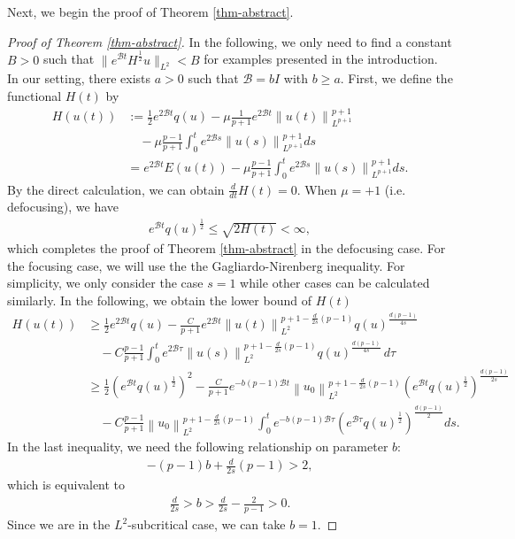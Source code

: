 \documentclass[10pt%
]{amsart}
\numberwithin{equation}{section}
\theoremstyle{definition}
\begin{document}
Next, we begin the  proof of Theorem \ref{thm-abstract}.
\begin{proof}[Proof of Theorem \ref{thm-abstract}]
	In the following, we only need to find a constant $B>0$ such that $\|e^{\mathcal Bt}H^\frac12u\|_{L^2}<B$ for examples presented in the introduction. In our setting, there exists $a>0$ such that $\mathcal{B}=bI$ with $b\geq a$. First, we define the functional $H(t)$ by
	\begin{align*}
		H(u(t)) &:= \frac{1}{2} e^{2\mathcal Bt} q(u) - \mu \frac{1}{p+1} e^{2\mathcal Bt} \left\| u(t) \right\|_{L^{p+1}}^{p+1} \\
		&\quad -\mu \frac{p-1}{p+1} \int_0^t e^{2\mathcal Bs} \left\| u(s) \right\|_{L^{p+1}}^{p+1} ds \\
		&= e^{2\mathcal Bt} E(u(t))- \mu \frac{p-1}{p+1} \int_0^t e^{2\mathcal Bs} \left\| u(s) \right\|_{L^{p+1}}^{p+1} ds.
	\end{align*}
	By the direct calculation, we can obtain $\frac{d}{dt}H(t)=0$. When $\mu=+1$ (i.e. defocusing), we have
	\begin{align*}
		e^{\mathcal Bt}q(u)^\frac12\leq \sqrt{2H(t)}<\infty,
	\end{align*}
	which completes the proof of Theorem \ref{thm-abstract} in the defocusing case. For the focusing case, we will use the  the Gagliardo-Nirenberg inequality. For simplicity, we only consider the case $s=1$ while other cases can be calculated similarly. In the following, we obtain the lower bound of $H(t)$
	\begin{equation}
		\begin{aligned}
			H(u(t)) &\geq \frac{1}{2} e^{2\mathcal Bt}q(u) 
			- \frac{C}{p+1} e^{2\mathcal Bt} \left\| u(t) \right\|_{L^2}^{p+1-\frac{d}{2s}(p-1)} 
			q(u)^{\frac{d(p-1)}{4s}} \\
			&\quad - C \frac{p-1}{p+1} \int_0^t e^{2\mathcal B\tau} \left\| u(s) \right\|_{L^2}^{p+1-\frac{d}{2s}(p-1)} 
			q(u)^{\frac{d(p-1)}{4s}}\, d\tau \\
			&\geq \frac{1}{2} \left(e^{\mathcal Bt}q(u)^\frac12\right)^2 
			- \frac{C}{p+1} e^{-b(p-1)\mathcal Bt} \left\| u_0 \right\|_{L^2}^{p+1-\frac{d}{2s}(p-1)} 
			\left(e^{\mathcal Bt}q(u)^\frac12\right)^{\frac{d(p-1)}{2s}} \\
			&\quad - C \frac{p-1}{p+1} \left\| u_0 \right\|_{L^2}^{p+1-\frac{d}{2s}(p-1)} 
			\int_0^t e^{-b(p-1)\mathcal B\tau} \left(e^{\mathcal B\tau} q(u)^\frac12\right)^{\frac{d(p-1)}{2}} ds.\label{eq:H}
		\end{aligned}
	\end{equation}
	In the last inequality, we need the following relationship on parameter $b$:
	\begin{align*}
		-(p-1)b+\frac{d}{2s}(p-1)>2,
	\end{align*}
	which is equivalent to
	\begin{align*}
		\frac{d}{2s}>b>\frac{d}{2s}-\frac{2}{p-1}>0.
	\end{align*}
	Since we are in the $L^2$-subcritical case, we can take $b=1$.
	

\end{proof}
\end{document}
